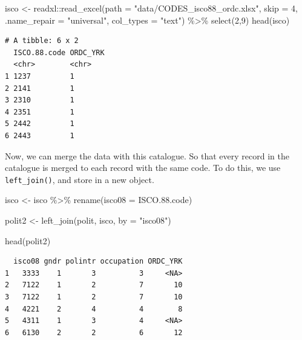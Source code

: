 \documentclass[
  letterpaper,
  DIV=11,
  numbers=noendperiod]{scrreprt}
\newenvironment{Shaded}{\begin{snugshade}}{\end{snugshade}}
\newcommand{\AttributeTok}[1]{\textcolor[rgb]{0.40,0.45,0.13}{#1}}
\newcommand{\DecValTok}[1]{\textcolor[rgb]{0.68,0.00,0.00}{#1}}
\newcommand{\FloatTok}[1]{\textcolor[rgb]{0.68,0.00,0.00}{#1}}
\newcommand{\FunctionTok}[1]{\textcolor[rgb]{0.28,0.35,0.67}{#1}}
\newcommand{\NormalTok}[1]{\textcolor[rgb]{0.00,0.23,0.31}{#1}}
\newcommand{\OtherTok}[1]{\textcolor[rgb]{0.00,0.23,0.31}{#1}}
\newcommand{\SpecialCharTok}[1]{\textcolor[rgb]{0.37,0.37,0.37}{#1}}
\newcommand{\StringTok}[1]{\textcolor[rgb]{0.13,0.47,0.30}{#1}}
\theoremstyle{definition}
\theoremstyle{remark}
\begin{document}
\begin{Shaded}
\begin{Highlighting}[]
\NormalTok{isco }\OtherTok{\textless{}{-}}\NormalTok{ readxl}\SpecialCharTok{::}\FunctionTok{read\_excel}\NormalTok{(}\AttributeTok{path =} \StringTok{"data/CODES\_isco88\_ordc.xlsx"}\NormalTok{, }\AttributeTok{skip =} \DecValTok{4}\NormalTok{, }\AttributeTok{.name\_repair =} \StringTok{"universal"}\NormalTok{, }\AttributeTok{col\_types =} \StringTok{"text"}\NormalTok{) }\SpecialCharTok{\%\textgreater{}\%} 
  \FunctionTok{select}\NormalTok{(}\DecValTok{2}\NormalTok{,}\DecValTok{9}\NormalTok{) }
\FunctionTok{head}\NormalTok{(isco)}
\end{Highlighting}
\end{Shaded}

\begin{verbatim}
# A tibble: 6 x 2
  ISCO.88.code ORDC_YRK
  <chr>        <chr>   
1 1237         1       
2 2141         1       
3 2310         1       
4 2351         1       
5 2442         1       
6 2443         1       
\end{verbatim}

Now, we can merge the data with this catalogue. So that every record in
the catalogue is merged to each record with the same code. To do this,
we use \texttt{left\_join()}, and store in a new object.

\begin{Shaded}
\begin{Highlighting}[]
\NormalTok{isco }\OtherTok{\textless{}{-}}\NormalTok{ isco }\SpecialCharTok{\%\textgreater{}\%} 
  \FunctionTok{rename}\NormalTok{(}\AttributeTok{isco08 =}\NormalTok{ ISCO.}\FloatTok{88.}\NormalTok{code)}

\NormalTok{polit2 }\OtherTok{\textless{}{-}} \FunctionTok{left\_join}\NormalTok{(polit, isco, }\AttributeTok{by =} \StringTok{"isco08"}\NormalTok{)}

\FunctionTok{head}\NormalTok{(polit2)}
\end{Highlighting}
\end{Shaded}

\begin{verbatim}
  isco08 gndr polintr occupation ORDC_YRK
1   3333    1       3          3     <NA>
2   7122    1       2          7       10
3   7122    1       2          7       10
4   4221    2       4          4        8
5   4311    1       3          4     <NA>
6   6130    2       2          6       12
\end{verbatim}
\end{document}
